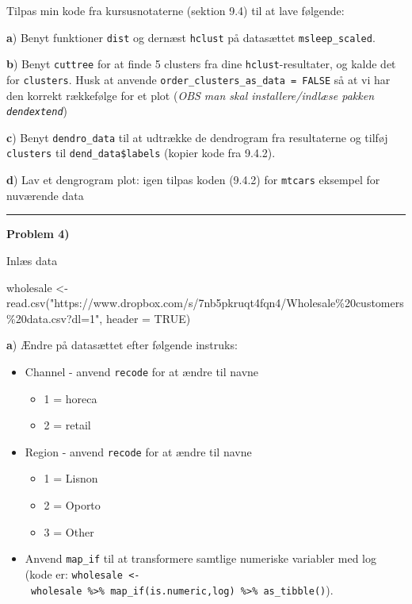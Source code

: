 \documentclass[
]{book}
\newenvironment{Shaded}{\begin{snugshade}}{\end{snugshade}}
\newcommand{\AttributeTok}[1]{\textcolor[rgb]{0.77,0.63,0.00}{#1}}
\newcommand{\ConstantTok}[1]{\textcolor[rgb]{0.00,0.00,0.00}{#1}}
\newcommand{\FunctionTok}[1]{\textcolor[rgb]{0.00,0.00,0.00}{#1}}
\newcommand{\NormalTok}[1]{#1}
\newcommand{\OtherTok}[1]{\textcolor[rgb]{0.56,0.35,0.01}{#1}}
\newcommand{\StringTok}[1]{\textcolor[rgb]{0.31,0.60,0.02}{#1}}
\providecommand{\tightlist}{%
  \setlength{\itemsep}{0pt}\setlength{\parskip}{0pt}}
\begin{document}
Tilpas min kode fra kursusnotaterne (sektion 9.4) til at lave følgende:

\textbf{a}) Benyt funktioner \texttt{dist} og dernæst \texttt{hclust} på datasættet \texttt{msleep\_scaled}.

\textbf{b}) Benyt \texttt{cuttree} for at finde 5 clusters fra dine \texttt{hclust}-resultater, og kalde det for \texttt{clusters}. Husk at anvende \texttt{order\_clusters\_as\_data\ =\ FALSE} så at vi har den korrekt rækkefølge for et plot (\emph{OBS man skal installere/indlæse pakken \texttt{dendextend}})

\textbf{c}) Benyt \texttt{dendro\_data} til at udtrække de dendrogram fra resultaterne og tilføj \texttt{clusters} til \texttt{dend\_data\$labels} (kopier kode fra 9.4.2).

\textbf{d}) Lav et dengrogram plot: igen tilpas koden (9.4.2) for \texttt{mtcars} eksempel for nuværende data

\begin{center}\rule{0.5\linewidth}{0.5pt}\end{center}

\textbf{Problem 4)}

Inlæs data

\begin{Shaded}
\begin{Highlighting}[]
\NormalTok{wholesale }\OtherTok{\textless{}{-}} \FunctionTok{read.csv}\NormalTok{(}\StringTok{"https://www.dropbox.com/s/7nb5pkruqt4fqn4/Wholesale\%20customers\%20data.csv?dl=1"}\NormalTok{, }\AttributeTok{header =} \ConstantTok{TRUE}\NormalTok{)}
\end{Highlighting}
\end{Shaded}

\textbf{a}) Ændre på datasættet efter følgende instruks:

\begin{itemize}
\tightlist
\item
  Channel - anvend \texttt{recode} for at ændre til navne

  \begin{itemize}
  \tightlist
  \item
    1 = horeca
  \item
    2 = retail
  \end{itemize}
\item
  Region - anvend \texttt{recode} for at ændre til navne

  \begin{itemize}
  \tightlist
  \item
    1 = Lisnon
  \item
    2 = Oporto
  \item
    3 = Other
  \end{itemize}
\item
  Anvend \texttt{map\_if} til at transformere samtlige numeriske variabler med log (kode er: \texttt{wholesale\ \textless{}-\ wholesale\ \%\textgreater{}\%\ map\_if(is.numeric,log)\ \%\textgreater{}\%\ as\_tibble()}).
\end{itemize}
\end{document}
